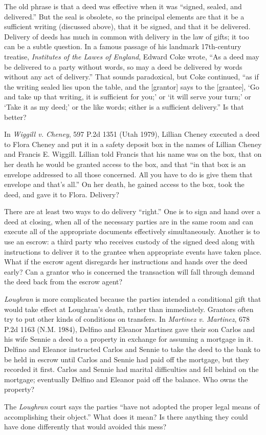
\item The old phrase is that a deed was effective when it was ``signed, sealed,
and delivered.'' But the seal is obsolete, so the principal elements are that
it be a sufficient writing (discussed above), that it be signed, and that it be
delivered. Delivery of deeds has much in common with delivery in the law of
gifts; it too can be a subtle question. In a famous passage of his landmark
17th-century treatise, \textit{Institutes of the Lawes of England}, Edward Coke
wrote, ``As a deed may be delivered to a party without words, so may a deed be
delivered by words without any act of delivery.'' That sounds paradoxical, but
Coke continued, ``as if the writing sealed lies upon the table, and the
[grantor] says to the [grantee], `Go and take up that writing, it is sufficient
for you;' or `it will serve your turn;' or `Take it as my deed;' or the like
words; either is a sufficient delivery.'' Is that better?


\item In \textit{Wiggill v. Cheney}, 597 P.2d 1351 (Utah 1979), Lillian Cheney
executed a deed to Flora Cheney and put it in a safety deposit box in the names
of Lillian Cheney and Francis E. Wiggill. Lillian told Francis that his name
was on the box, that on her death he would be granted access to the box, and
that ``in that box is an envelope addressed to all those concerned. All you
have to do is give them that envelope and that's all.'' On her death, he gained
access to the box, took the deed, and gave it to Flora. Delivery? 


\item There are at least two ways to do delivery ``right.'' One is to sign and
hand over a deed at closing, when all of the necessary parties are in the same
room and can execute all of the appropriate documents effectively
simultaneously. Another is to use an escrow: a third party who receives custody
of the signed deed along with instructions to deliver it to the grantee when
appropriate events have taken place. What if the escrow agent disregards her
instructions and hands over the deed early? Can a grantor who is concerned the
transaction will fall through demand the deed back from the escrow agent?


\item \textit{Loughran} is more complicated because the parties intended a
conditional gift that would take effect at Loughran's death, rather than
immediately. Grantors often try to put other kinds of conditions on transfers.
In \textit{Martinez v. Martinez}, 678 P.2d 1163 (N.M. 1984), Delfino and
Eleanor Martinez gave their son Carlos and his wife Sennie a deed to a property
in exchange for assuming a mortgage in it. Delfino and Eleanor instructed
Carlos and Sennie to take the deed to the bank to be held in escrow until
Carlos and Sennie had paid off the mortgage, but they recorded it first. Carlos
and Sennie had marital difficulties and fell behind on the mortgage; eventually
Delfino and Eleanor paid off the balance. Who owns the property?


\item The \textit{Loughran} court says the parties ``have not adopted the proper
legal means of accomplishing their object.'' What does it mean? Is there
anything they could have done differently that would avoided this mess?

